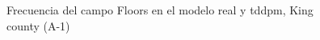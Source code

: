 \begin{figure}[H]
    \centering
    
    \caption{Frecuencia del campo Floors en el modelo real y tddpm, King county (A-1)}
    \label{frecuency-tddpm-floors}
\end{figure}
